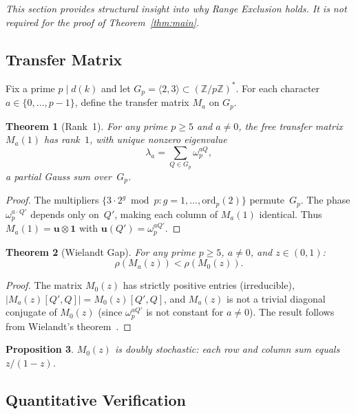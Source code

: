 \documentclass[11pt,a4paper]{article}
\theoremstyle{plain}
\newtheorem{theorem}{Theorem}[section]
\newtheorem{proposition}[theorem]{Proposition}
\theoremstyle{definition}
\newcommand{\Z}{\mathbb{Z}}
\newcommand{\ord}{\mathrm{ord}}
\begin{document}
\emph{This section provides structural insight into why Range Exclusion holds. It is not required for the proof of Theorem~\ref{thm:main}.}

\subsection{Transfer Matrix}

Fix a prime $p \mid d(k)$ and let $G_p = \langle 2, 3 \rangle \subset (\Z/p\Z)^*$. For each character $a \in \{0, \ldots, p-1\}$, define the transfer matrix $M_a$ on $G_p$.

\begin{theorem}[Rank~1]\label{thm:rank1}
For any prime $p \geq 5$ and $a \neq 0$, the free transfer matrix $M_a(1)$ has rank~$1$, with unique nonzero eigenvalue
\[
\lambda_a = \sum_{Q \in G_p} \omega_p^{aQ},
\]
a partial Gauss sum over~$G_p$.
\end{theorem}

\begin{proof}
The multipliers $\{3 \cdot 2^g \bmod p : g = 1, \ldots, \ord_p(2)\}$ permute~$G_p$. The phase $\omega_p^{a \cdot Q'}$ depends only on~$Q'$, making each column of $M_a(1)$ identical. Thus $M_a(1) = \mathbf{u} \otimes \mathbf{1}$ with $\mathbf{u}(Q') = \omega_p^{aQ'}$.
\end{proof}

\begin{theorem}[Wielandt Gap]\label{thm:wielandt}
For any prime $p \geq 5$, $a \neq 0$, and $z \in (0,1)$:
\[
\rho(M_a(z)) < \rho(M_0(z)).
\]
\end{theorem}

\begin{proof}
The matrix $M_0(z)$ has strictly positive entries (irreducible), $|M_a(z)[Q',Q]| = M_0(z)[Q',Q]$, and $M_a(z)$ is not a trivial diagonal conjugate of $M_0(z)$ (since $\omega_p^{aQ'}$ is not constant for $a \neq 0$). The result follows from Wielandt's theorem~\cite{Wielandt50}.
\end{proof}

\begin{proposition}\label{prop:DS}
$M_0(z)$ is doubly stochastic: each row and column sum equals $z/(1-z)$.
\end{proposition}

\subsection{Quantitative Verification}
\end{document}
